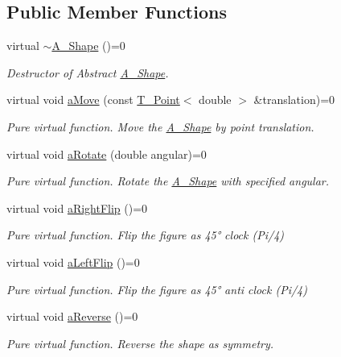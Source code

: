\subsection*{Public Member Functions}
\begin{DoxyCompactItemize}
\item 
virtual \hyperlink{classA__Shape_ad0a3bcb28f3d4f42043ea8c592bb5f1f}{$\sim$\+A\+\_\+\+Shape} ()=0
\begin{DoxyCompactList}\small\item\em Destructor of Abstract \hyperlink{classA__Shape}{A\+\_\+\+Shape}. \end{DoxyCompactList}\item 
virtual void \hyperlink{classA__Shape_ab284298db1b557ccfa7ba6de7a5fee2c}{a\+Move} (const \hyperlink{classT__Point}{T\+\_\+\+Point}$<$ double $>$ \&translation)=0
\begin{DoxyCompactList}\small\item\em Pure virtual function. Move the \hyperlink{classA__Shape}{A\+\_\+\+Shape} by point translation. \end{DoxyCompactList}\item 
virtual void \hyperlink{classA__Shape_a25b4e0c34cdb46da5382fe9c7467efaf}{a\+Rotate} (double angular)=0
\begin{DoxyCompactList}\small\item\em Pure virtual function. Rotate the \hyperlink{classA__Shape}{A\+\_\+\+Shape} with specified angular. \end{DoxyCompactList}\item 
virtual void \hyperlink{classA__Shape_a892688cbbad3297e00e87cce0dbfc76d}{a\+Right\+Flip} ()=0
\begin{DoxyCompactList}\small\item\em Pure virtual function. Flip the figure as 45° clock (Pi/4) \end{DoxyCompactList}\item 
virtual void \hyperlink{classA__Shape_abe947e7003cb63be2b4f6c439533427d}{a\+Left\+Flip} ()=0
\begin{DoxyCompactList}\small\item\em Pure virtual function. Flip the figure as 45° anti clock (Pi/4) \end{DoxyCompactList}\item 
virtual void \hyperlink{classA__Shape_afe2c7969d647f6358da13879a7534ecb}{a\+Reverse} ()=0
\begin{DoxyCompactList}\small\item\em Pure virtual function. Reverse the shape as symmetry. \end{DoxyCompactList}\item 

\end{DoxyCompactItemize}
